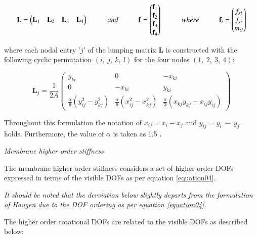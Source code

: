 \begin{equation} 
\mathbf{L} =
\begin{pmatrix}
\mathbf{L}_1 & \mathbf{L}_2 & \mathbf{L}_3 & \mathbf{L}_4
\end{pmatrix}
\hspace{10mm}
and
\hspace{10mm}
\mathbf{f} =
\begin{pmatrix}
\mathbf{f}_1 \\
\mathbf{f}_2 \\
\mathbf{f}_3 \\
\mathbf{f}_4
\end{pmatrix}
\hspace{10mm}
where
\hspace{10mm}
\mathbf{f}_i =
\begin{pmatrix}
{f_{xi}} \\
{f_{yi}} \\
{m_{zi}}
\end{pmatrix}
\label{equation06}
\end{equation}

where each nodal entry '$j$' of the lumping matrix $\mathbf{L}$ is constructed with the following cyclic permutation $(i,\ j,\ k,\ l)$ for the four nodes $(1,\ 2,\ 3,\ 4)$:

\begin{equation} 
\mathbf{L}_j = \frac{1}{2 A}
\begin{pmatrix}
y_{ki} & 0 & -x_{ki} \\
0 & -x_{ki} & y_{ki} \\
\frac{\alpha}{6}(y_{ij}^2 - y_{kj}^2 ) & \frac{\alpha}{6}(x_{ij}^2 - x_{kj}^2 ) & \frac{\alpha}{3}(x_{kj}y_{kj} - x_{ij}y_{ij})
\end{pmatrix}
\label{equation07}
\end{equation}

Throughout this formulation the notation of $x_{ij} = x_i - x_j$ and $y_{ij} = y_i\ -\ y_j$ holds. Furthermore, the value of $\alpha$ is taken as 1.5 \cite{Fel91}.

\textit{Membrane higher order stiffness}

The membrane higher order stiffness considers a set of higher order DOFs expressed in terms of the visible DOFs as per equation \eqref{equation04}.

\textit{It should be noted that the derviation below slightly departs from the formulation of Haugen \cite{Hau94} due to the DOF ordering as per equation \eqref{equation04}.}

The higher order rotational DOFs are related to the visible DOFs as described below:

